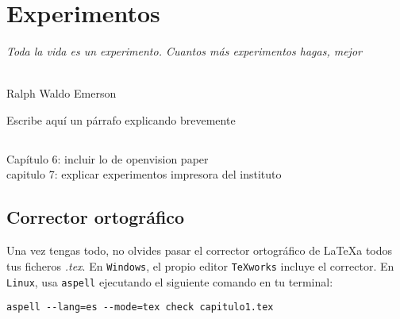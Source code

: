 \chapter{Experimentos}
\label{cap:capitulo7}

\begin{flushright}
\begin{minipage}[]{10cm}
\emph{Toda la vida es un experimento. Cuantos más experimentos hagas, mejor}\\
\end{minipage}\\

Ralph Waldo Emerson\\
\end{flushright}

\vspace{1cm}

Escribe aquí un párrafo explicando brevemente 

\section{}

Capítulo 6: incluir lo de openvision paper\\
capitulo 7: explicar experimentos impresora del instituto \\


\section{Corrector ortográfico}

Una vez tengas todo, no olvides pasar el corrector ortográfico de \LaTeX a todos tus ficheros \textit{.tex}. En \texttt{Windows}, el propio editor \texttt{TeXworks} incluye el corrector. En \texttt{Linux}, usa \texttt{aspell} ejecutando el siguiente comando en tu terminal:

\begin{verbatim}
aspell --lang=es --mode=tex check capitulo1.tex
\end{verbatim}
